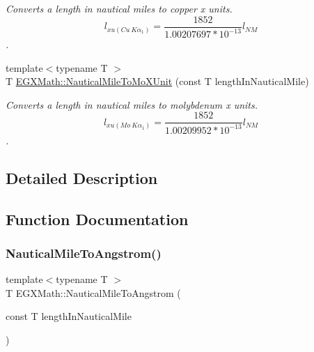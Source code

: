 \begin{DoxyCompactItemize}
\begin{DoxyCompactList}\small\item\em Converts a length in nautical miles to copper x units. \[ l_{xu(Cu\ K\alpha_1)}= \frac{1852}{1.00207697*10^{-13}} l_{NM}\]. \end{DoxyCompactList}\item 
{\footnotesize template$<$typename T $>$ }\\T \mbox{\hyperlink{group___e_g_x_math-_conversions-_length_conversions-_nautical-_nautical_mile-_non-_s_i_ga17cfe98568d00c2e0b1c0b5d19f1b34e}{E\+G\+X\+Math\+::\+Nautical\+Mile\+To\+Mo\+X\+Unit}} (const T length\+In\+Nautical\+Mile)
\begin{DoxyCompactList}\small\item\em Converts a length in nautical miles to molybdenum x units. \[ l_{xu(Mo\ K\alpha_1)}=\frac{1852}{1.00209952*10^{-13}} l_{NM}\]. \end{DoxyCompactList}\end{DoxyCompactItemize}


\subsection{Detailed Description}


\subsection{Function Documentation}
\mbox{\label{group___e_g_x_math-_conversions-_length_conversions-_nautical-_nautical_mile-_non-_s_i_ga6f451e4456d985c7d63b39a084b3dd23}} 
\subsubsection{\texorpdfstring{Nautical\+Mile\+To\+Angstrom()}{NauticalMileToAngstrom()}}
{\footnotesize\ttfamily template$<$typename T $>$ \\
T E\+G\+X\+Math\+::\+Nautical\+Mile\+To\+Angstrom (\begin{DoxyParamCaption}\item[{const T}]{length\+In\+Nautical\+Mile }\end{DoxyParamCaption})}



